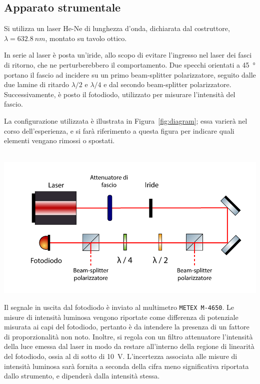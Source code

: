 \documentclass[10pt,oneside,a4paper]{article}
\newenvironment{Figure}
  {\par\medskip\noindent\minipage{\linewidth}}
  {\endminipage\par\medskip}
\begin{document}
\begin{multicols}{2}
\section{Apparato strumentale}

Si utilizza un laser He-Ne di lunghezza d'onda, dichiarata dal costruttore, $\lambda = \SI{632.8}{nm}$, montato su tavolo ottico. 

In serie al laser è posta un'iride, allo scopo di evitare l'ingresso nel laser dei fasci di ritorno, che ne perturberebbero il comportamento. Due specchi orientati a \SI{45}{\degree} portano il fascio ad incidere su un primo beam-splitter polarizzatore, seguito dalle due lamine di ritardo $\lambda / 2$ e $\lambda / 4$ e dal secondo beam-splitter polarizzatore. Successivamente, è posto il fotodiodo, utilizzato per misurare l'intensità del fascio.

La configurazione utilizzata è illustrata in Figura~\ref{fig:diagram}; essa varierà nel corso dell'esperienza, e si farà riferimento a questa figura per indicare quali elementi vengano rimossi o spostati.

\begin{Figure}
	\begin{center}
	\hbox{\hspace{-0.8cm}
	\includegraphics[width=1.1\linewidth]{diagram.png}}
	\label{fig:diagram}
	\end{center}
\end{Figure}

Il segnale in uscita dal fotodiodo è inviato al multimetro \texttt{METEX M-4650}. Le misure di intensità luminosa vengono riportate come differenza di potenziale misurata ai capi del fotodiodo, pertanto è da intendere la presenza di un fattore di proporzionalità non noto. Inoltre, si regola con un filtro attenuatore l'intensità della luce emessa dal laser in modo da restare all'interno della regione di linearità del fotodiodo, ossia al di sotto di \SI{10}{V}. L'incertezza associata alle misure di intensità luminosa sarà fornita a seconda della cifra meno significativa riportata dallo strumento, e dipenderà dalla intensità stessa.




\end{multicols}
\end{document}
